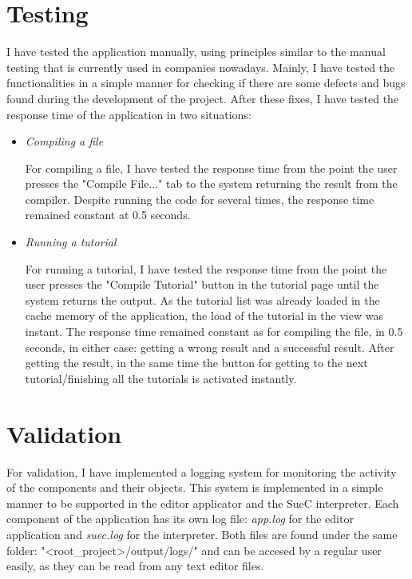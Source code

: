 \documentclass[12pt,a4paper,twoside]{report}
\begin{document}
\section{Testing}

I have tested the application manually, using principles similar to the manual testing that is currently used in companies nowadays. Mainly, I have tested the functionalities in a simple manner for checking if there are some defects and bugs found during the development of the project. After these fixes, I have tested the response time of the application in two situations:

\begin{itemize}

\item \textit{Compiling a file}

 For compiling a file, I have tested the response time from the point the user presses the "Compile File..." tab to the system returning the result from the compiler. Despite running the code for several times, the response time remained constant at 0.5 seconds.

\item \textit{Running a tutorial}

 For running a tutorial, I have tested the response time from the point the user presses the "Compile Tutorial" button in the tutorial page until the system returns the output. As the tutorial list was already loaded in the cache memory of the application, the load of the tutorial in the view was instant. The response time remained constant as for compiling the file, in 0.5 seconds, in either case: getting a wrong result and a successful result. After getting the result, in the same time the button for getting to the next tutorial/finishing all the tutorials is activated instantly.
\end{itemize}
\section{Validation}

For validation, I have implemented a logging system for monitoring the activity of the components and their objects. This system is implemented in a simple manner to be supported in the editor applicator and the SueC interpreter. Each component of the application has its own log file: \textit{app.log} for the editor application and \textit{suec.log} for the interpreter. Both files are found under the same folder: "<root\_project>/output/logs/" and can be accesed by a regular user easily, as they can be read from any text editor files. 
\end{document}
